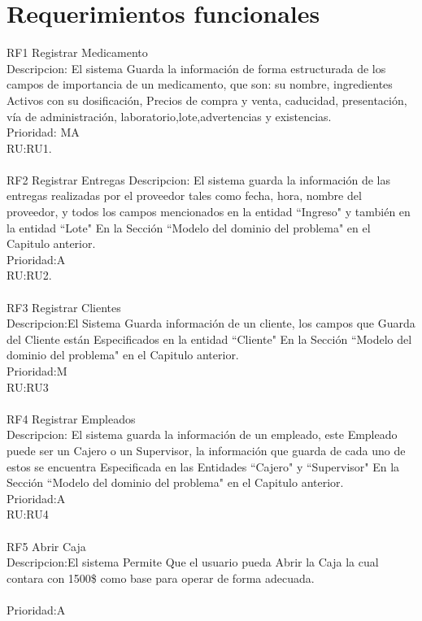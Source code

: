\section{Requerimientos funcionales}
RF1 Registrar Medicamento\\
Descripcion: El sistema Guarda la información de forma estructurada de los campos de importancia de un medicamento, que son: su nombre, ingredientes Activos con su dosificación, Precios de compra y venta, caducidad, presentación, vía de administración, laboratorio,lote,advertencias y existencias.\\
Prioridad: MA\\
RU:RU1.\\
\\
RF2 Registrar Entregas 
Descripcion: El sistema guarda la información de las entregas realizadas por el proveedor tales como fecha, hora, nombre del proveedor, y todos los campos mencionados en la entidad ``Ingreso" y también en la entidad ``Lote" En la Sección ``Modelo del dominio del problema" en el  Capitulo anterior.\\
Prioridad:A\\
RU:RU2.\\
\\
RF3 Registrar Clientes\\
Descripcion:El Sistema Guarda información de un cliente, los campos que Guarda del Cliente están Especificados en la entidad ``Cliente" En la Sección ``Modelo del dominio del problema" en el  Capitulo anterior.\\
Prioridad:M\\
RU:RU3\\
\\
RF4 Registrar Empleados\\
Descripcion: El sistema guarda la información de un empleado, este Empleado puede ser un Cajero o un Supervisor, la información que guarda de cada uno de estos se encuentra Especificada en las Entidades ``Cajero" y ``Supervisor" En la Sección ``Modelo del dominio del problema" en el  Capitulo anterior.\\
Prioridad:A\\
RU:RU4\\
\\
RF5 Abrir Caja\\
Descripcion:El sistema Permite Que el usuario pueda Abrir la Caja la cual contara con 1500\$ como base para operar de forma adecuada.\\
\\
Prioridad:A\\
